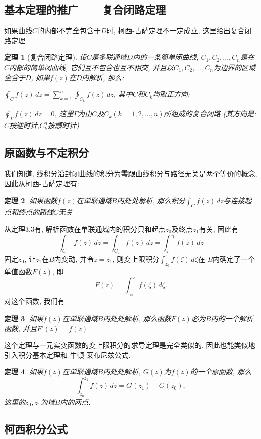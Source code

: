 \documentclass[12pt, a4paper, oneside]{ctexart}
\theoremstyle{plain}
\newtheorem{theorem}{定理}[section]
\theoremstyle{definition}
\theoremstyle{definition}
\begin{document}
\subsection{基本定理的推广——复合闭路定理}
如果曲线$C$的内部不完全包含于$D$时, 柯西-古萨定理不一定成立, 这里给出复合闭路定理
\begin{theorem}[复合闭路定理]
    \hspace{0em}
    
    设$C$是多联通域$D$内的一条简单闭曲线, $C_1,C_2,...,C_n$是在$C$内部的简单闭曲线, 它们互不包含也互不相交, 
并且以$C_1,C_2,...,C_n$为边界的区域全含于$D$, 如果$f(z)$在$D$内解析, 那么: 

$\oint_{C}f(z)\,dz=\sum_{k=1}^{n}\oint_{C_k}f(z)\,dz$, 其中$C$和$C_k$均取正方向; 

$\oint_{\Gamma}f(z)\,dz=0$, 这里$\Gamma$为由$C$及$C_k(k=1,2,...,n)$所组成的复合闭路
(其方向是:$C$按逆时针,$C_k^n$按顺时针)

\end{theorem}
\subsection{原函数与不定积分}
我们知道, 线积分沿封闭曲线的积分为零跟曲线积分与路径无关是两个等价的概念, 因此从柯西-古萨定理有:
\begin{theorem}
    如果函数$f(z)$在单联通域$B$内处处解析, 那么积分$\int_Cf(z)\,dz$与连接起点和终点的路线$C$无关
\end{theorem}
从定理3.3有, 解析函数在单联通域内的积分只和起点$z_0$及终点$z_1$有关, 因此有
\[
\int_{C_1}f(z)\,dz=\int_{C_2}f(z)\,dz=\int_{z_0}^{z_1}f(z)\,dz
\]
固定$z_0$, 让$z_1$在$B$内变动, 并令$z=z_1$, 则变上限积分$\int_{z_0}^{z}f(\zeta)\,d\zeta$在
$B$内确定了一个单值函数$F(z)$, 即
\[
F(z)=\int_{z_0}^{z}f(\zeta)\,d\zeta.
\]
对这个函数, 我们有
\begin{theorem}
    如果$f(z)$在单联通域$B$内处处解析, 那么函数$F(z)$必为$B$内的一个解析函数, 并且$F'(z)=f(z)$
\end{theorem}
\noindent 这个定理与一元实变函数的变上限积分的求导定理是完全类似的, 因此也能类似地引入积分基本定理和
牛顿-莱布尼兹公式.
\begin{theorem}
    如果$f(z)$在单联通域$B$内处处解析, $G(z)$为$f(z)$的一个原函数, 那么
    \[
        \int_{z_0}^{z_1}f(z)\,dz=G(z_1)-G(z_0),
    \]
    这里的$z_0,z_1$为域$B$内的两点.
\end{theorem}
\subsection{柯西积分公式}
\end{document}
